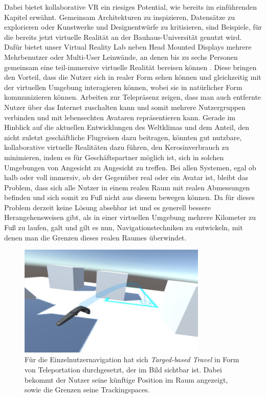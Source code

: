 Dabei bietet kollaborative VR ein riesiges Potential, wie bereits im einführenden Kapitel erwähnt. Gemeinsam Architekturen zu inspizieren, Datensätze zu explorieren oder Kunstwerke und Designentwürfe zu kritisieren, sind Beispiele, für die bereits jetzt virtuelle Realität an der Bauhaus-Universität genutzt wird. Dafür bietet unser Virtual Reality Lab neben Head Mounted Displays mehrere Mehrbenutzer oder Multi-User Leinwände, an denen bis zu sechs Personen gemeinsam eine teil-immersive virtuelle Realität bereisen können \cite{Kulik2011C1x6}. Diese bringen den Vorteil, dass die Nutzer sich in realer Form sehen können und gleichzeitig mit der virtuellen Umgebung interagieren können, wobei sie in natürlicher Form kommunizieren können.
Arbeiten zur Telepräsenz \cite{BeckImmersiveTelepresence} zeigen, dass man auch entfernte Nutzer über das Internet zuschalten kann und somit mehrere Nutzergruppen verbinden und mit lebensechten Avataren repräsentieren kann. 
Gerade im Hinblick auf die aktuellen Entwicklungen des Weltklimas und dem Anteil, den nicht zuletzt geschäftliche Flugreisen dazu beitragen, könnten gut nutzbare, kollaborative virtuelle Realitäten dazu führen, den Kerosinverbrauch zu minimieren, indem es für Geschäftspartner möglich ist, sich in solchen Umgebungen \glqq von Angesicht zu Angesicht \grqq{} zu treffen.
Bei allen Systemen, egal ob halb oder voll immersiv, ob der Gegenüber real oder ein Avatar ist, bleibt das Problem, dass sich alle Nutzer in einem realen Raum mit realen Abmessungen befinden und sich somit zu Fuß nicht aus diesem bewegen können. Da für dieses Problem derzeit keine Lösung absehbar ist und es generell bessere Herangehensweisen gibt, als in einer virtuellen Umgebung mehrere Kilometer zu Fuß zu laufen, galt und gilt es nun, Navigationstechniken zu entwickeln, mit denen man die Grenzen dieses realen Raumes überwindet.

\begin{figure}[H]
	\centering
		\includegraphics[width=0.8\textwidth]{images/steam_teleport.jpg}
	\caption{Für die Einzelnutzernavigation hat sich \textit{Targed-based Travel} in Form von Teleportation durchgesetzt, der im Bild sichtbar ist. Dabei bekommt der Nutzer seine künftige Position im Raum angezeigt, sowie die Grenzen seine Trackingspaces.}
\end{figure}


